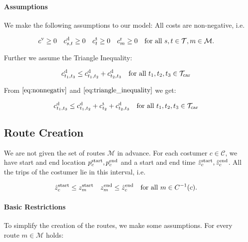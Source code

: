 \paragraph{Assumptions} \parfill

We make the following assumptions to our model: All costs are non-negative, i.e.

\begin{align}
\label{eq:nonnegativ}
	c^{\operatorname{v}}\geq 0 && c^{\operatorname{d}}_{s,t}\geq 0 && c^{\operatorname{t}}_t\geq 0 && c^{\operatorname{r}}_m\geq 0 && \text{for all } s,t\in\mathcal{T}, m\in\mathcal{M}.
\end{align}

Further we assume the Triangle Inequality:

\begin{align}
\label{eq:triangle_inequality}
	c^{\operatorname{d}}_{t_1,t_3} \leq c^{\operatorname{d}}_{t_1,t_2} + c^{\operatorname{d}}_{t_2,t_3} && \text{for all } t_1,t_2,t_3\in\mathcal{T}_{\operatorname{car}}
\end{align}

From $\eqref{eq:nonnegativ}$ and $\eqref{eq:triangle_inequality}$ we get:

\begin{align}
\label{eq:triangle_inequality_ext}
	c^{\operatorname{d}}_{t_1,t_3} \leq c^{\operatorname{d}}_{t_1,t_2} + c^{\operatorname{t}}_{t_2} + c^{\operatorname{d}}_{t_2,t_3} && \text{for all } t_1,t_2,t_3\in\mathcal{T}_{\operatorname{car}}
\end{align}


\subsection{Route Creation}

We are not given the set of routes $\mathcal{M}$ in advance. For each costumer $c\in\mathcal{C}$, we have start and end location $p^{\operatorname{start}}_c, p^{\operatorname{end}}_c$ and a start and end time $\hat{z}^{\operatorname{start}}_c, \hat{z}^{\operatorname{end}}_c$. All the trips of the costumer lie in this interval, i.e.

\begin{align*}
	\hat{z}^{\operatorname{start}}_c \leq z^{\operatorname{start}}_m && z^{\operatorname{end}}_m \leq \hat{z}^{\operatorname{end}}_c && \text{for all } m\in C^{-1}(c).
\end{align*}

\paragraph{Basic Restrictions} \parfill

To simplify the creation of the routes, we make some assumptions. For every route $m\in\mathcal{M}$ holds:

